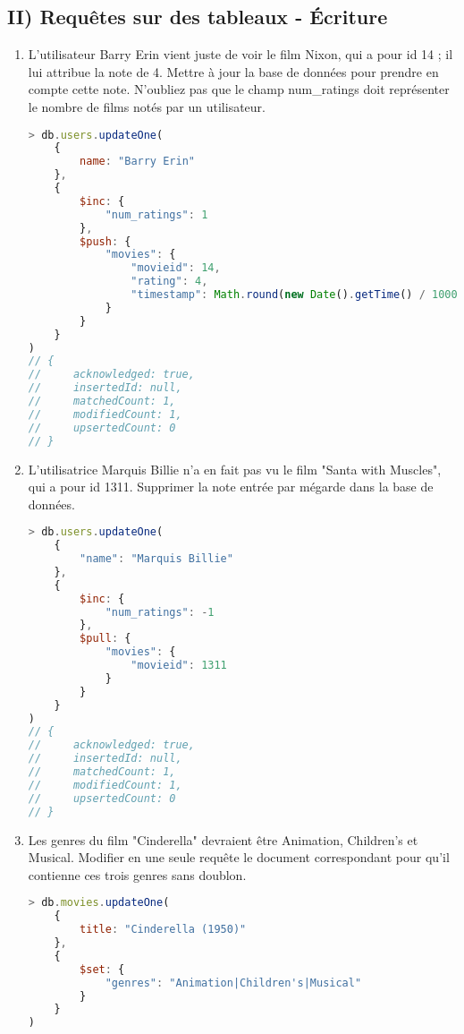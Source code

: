 \documentclass{article}
\begin{document}
\subsection*{II) Requêtes sur des tableaux - Écriture}

\begin{enumerate}

\item L'utilisateur Barry Erin vient juste de voir le film Nixon, qui a pour id 14 ; il lui attribue la note de 4. Mettre à jour la base de données pour prendre en compte cette note. N'oubliez pas que le champ num\_ratings doit représenter le nombre de films notés par un utilisateur.
\begin{lstlisting}[language=JavaScript]
> db.users.updateOne(
    {
        name: "Barry Erin"
    }, 
    {
        $inc: {
            "num_ratings": 1
        },
        $push: {
            "movies": {
                "movieid": 14,
                "rating": 4,
                "timestamp": Math.round(new Date().getTime() / 1000)
            }
        }
    }
)
// {
//     acknowledged: true,
//     insertedId: null,
//     matchedCount: 1,
//     modifiedCount: 1,
//     upsertedCount: 0
// }
\end{lstlisting}

\item L'utilisatrice Marquis Billie n'a en fait pas vu le film "Santa with Muscles", qui a pour id 1311. Supprimer la note entrée par mégarde dans la base de données.
\begin{lstlisting}[language=JavaScript]
> db.users.updateOne(
    {
        "name": "Marquis Billie"
    },
    {
        $inc: {
            "num_ratings": -1
        },
        $pull: {
            "movies": {
                "movieid": 1311
            }
        }
    }
)
// {
//     acknowledged: true,
//     insertedId: null,
//     matchedCount: 1,
//     modifiedCount: 1,
//     upsertedCount: 0
// }
\end{lstlisting}

\item Les genres du film "Cinderella" devraient être Animation, Children's et Musical. Modifier en une seule requête le document correspondant pour qu'il contienne ces trois genres sans doublon.
\begin{lstlisting}[language=JavaScript]
> db.movies.updateOne(
    {
        title: "Cinderella (1950)"
    },
    {
        $set: {
            "genres": "Animation|Children's|Musical"
        }
    }
)
\end{lstlisting}

\end{enumerate}
\end{document}
